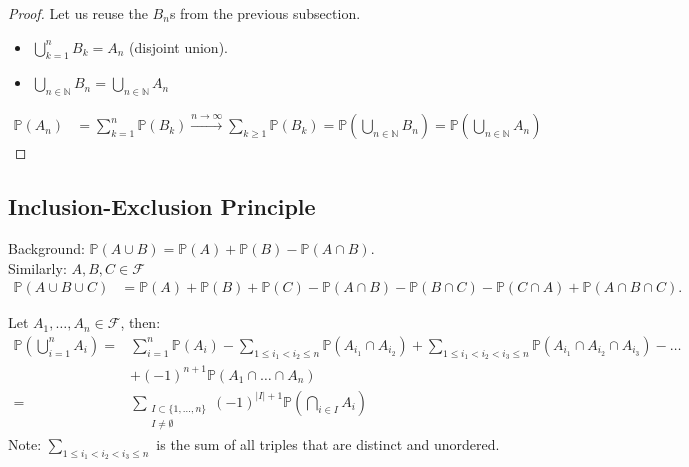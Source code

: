 \begin{proof}
    Let us reuse the $B_n$s from the previous subsection.
    \begin{itemize}
        \item $\bigcup_{k = 1}^n B_k = A_n$ (disjoint union).
        \item $\bigcup_{n \in \mathbb{N}} B_n = \bigcup_{n \in \mathbb{N}} A_n$
    \end{itemize} 
    \begin{align*}
        \mathbb{P}(A_n) &= \sum_{k=1}^{n} \mathbb{P}(B_k) \overset{n \to \infty}{\to} \sum_{k \geq 1} \mathbb{P}(B_k) = \mathbb{P} \left(\bigcup_{n \in \mathbb{N}} B_n \right) = \mathbb{P} \left(\bigcup_{n \in \mathbb{N}} A_n \right) 
    \end{align*} 
\end{proof} 

\subsection{Inclusion-Exclusion Principle}

Background: $\mathbb{P}(A \cup B) = \mathbb{P}(A) + \mathbb{P}(B) - \mathbb{P}(A \cap B)$. \\
Similarly: $A, B, C \in \mathcal{F}$
\begin{align*}
    \mathbb{P}(A \cup B \cup C) &= \mathbb{P}(A) + \mathbb{P}(B) + \mathbb{P}(C) - \mathbb{P}(A \cap B) - \mathbb{P}(B \cap C) - \mathbb{P}(C \cap A) + \mathbb{P}(A \cap B \cap C).
\end{align*} 

\begin{proposition} \label{prp:IEP}
    Let $A_1, \dots, A_n \in \mathcal{F}$, then:
    \begin{align*}
        \mathbb{P} \left(\bigcup_{i = 1}^n A_i \right) = &\sum_{i=1}^{n} \mathbb{P}(A_i) - \sum_{1 \leq i_1 < i_2 \leq n} \mathbb{P}(A_{i_1} \cap A_{i_2}) + \sum_{1 \leq i_1 < i_2 < i_3 \leq n} \mathbb{P}(A_{i_1} \cap A_{i_2} \cap A_{i_3}) - \dots \\ &+ (-1)^{n + 1} \mathbb{P}(A_1 \cap \dots \cap A_n) \\
        = &\sum_{\substack{I \subset \{1, \dots, n\} \\ I \neq \emptyset} } (-1)^{|I| + 1} \mathbb{P} \left( \bigcap_{i \in I} A_i \right)
    \end{align*}
    Note: $\sum_{1 \leq i_1 < i_2 < i_3 \leq n}$ is the sum of all triples that are distinct and unordered.
\end{proposition}


